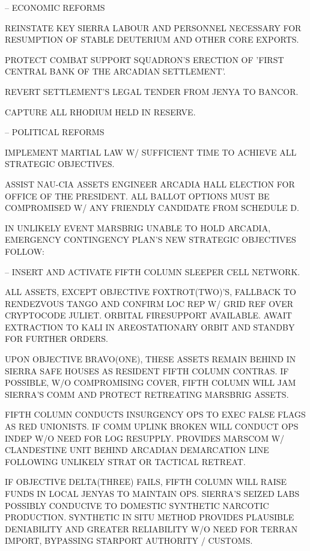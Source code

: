 \item {} -- ECONOMIC REFORMS
    \startitemize[n]
    \item REINSTATE KEY SIERRA LABOUR AND PERSONNEL NECESSARY FOR RESUMPTION OF STABLE DEUTERIUM AND OTHER CORE EXPORTS.
    \item PROTECT COMBAT SUPPORT SQUADRON'S ERECTION OF 'FIRST CENTRAL BANK OF THE ARCADIAN SETTLEMENT'.
    \item REVERT SETTLEMENT'S LEGAL TENDER FROM JENYA TO BANCOR.
    \item CAPTURE ALL RHODIUM HELD IN RESERVE.
    \stopitemize

\item {} -- POLITICAL REFORMS
    \startitemize[n]
    \item IMPLEMENT MARTIAL LAW W/ SUFFICIENT TIME TO ACHIEVE ALL STRATEGIC OBJECTIVES.
    \item ASSIST NAU-CIA ASSETS ENGINEER ARCADIA HALL ELECTION FOR OFFICE OF THE PRESIDENT. ALL BALLOT OPTIONS MUST BE COMPROMISED W/ ANY FRIENDLY CANDIDATE FROM SCHEDULE D.
    \stopitemize
\stopitemize

\page

IN UNLIKELY EVENT MARSBRIG UNABLE TO HOLD ARCADIA, EMERGENCY CONTINGENCY PLAN'S NEW STRATEGIC OBJECTIVES FOLLOW:
\startitemize[4]
\item {} -- INSERT AND ACTIVATE FIFTH COLUMN SLEEPER CELL NETWORK.

    \startitemize[n]
    \item ALL ASSETS, EXCEPT OBJECTIVE FOXTROT(TWO)'S, FALLBACK TO RENDEZVOUS TANGO AND CONFIRM LOC REP W/ GRID REF OVER CRYPTOCODE JULIET. ORBITAL FIRESUPPORT AVAILABLE. AWAIT EXTRACTION TO KALI IN AREOSTATIONARY ORBIT AND STANDBY FOR FURTHER ORDERS.

    \item UPON OBJECTIVE BRAVO(ONE), THESE ASSETS REMAIN BEHIND IN SIERRA SAFE HOUSES AS RESIDENT FIFTH COLUMN CONTRAS. IF POSSIBLE, W/O COMPROMISING COVER, FIFTH COLUMN WILL JAM SIERRA'S COMM AND PROTECT RETREATING MARSBRIG ASSETS.

    \item FIFTH COLUMN CONDUCTS INSURGENCY OPS TO EXEC FALSE FLAGS AS RED UNIONISTS. IF COMM UPLINK BROKEN WILL CONDUCT OPS INDEP W/O NEED FOR LOG RESUPPLY. PROVIDES MARSCOM W/ CLANDESTINE UNIT BEHIND ARCADIAN DEMARCATION LINE FOLLOWING UNLIKELY STRAT OR TACTICAL RETREAT.

    \item IF OBJECTIVE DELTA(THREE) FAILS, FIFTH COLUMN WILL RAISE FUNDS IN LOCAL JENYAS TO MAINTAIN OPS. SIERRA'S SEIZED LABS POSSIBLY CONDUCIVE TO DOMESTIC SYNTHETIC NARCOTIC PRODUCTION. SYNTHETIC IN SITU METHOD PROVIDES PLAUSIBLE DENIABILITY AND GREATER RELIABILITY W/O NEED FOR TERRAN IMPORT, BYPASSING STARPORT AUTHORITY / CUSTOMS.
    \stopitemize
\stopitemize
\stopTimelineCorrespondenceDocument


